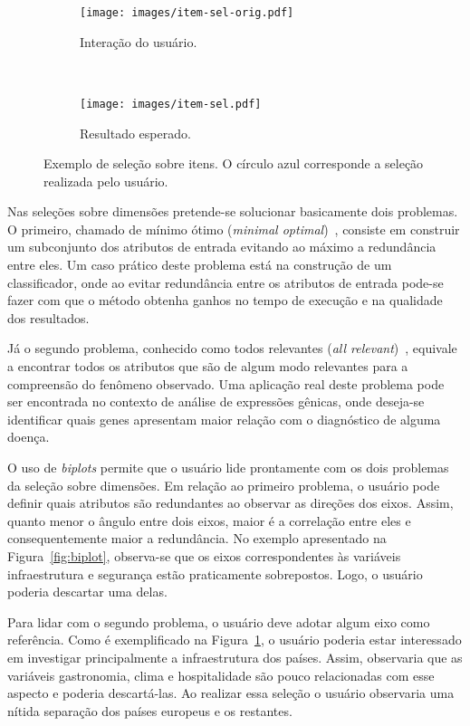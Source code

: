 \begin{figure}[h!]
  \centering
  \begin{subfigure}[b]{0.45\textwidth}
    \centering
    \texttt{[image: images/item-sel-orig.pdf]}
    \caption{Interação do usuário.}
  \end{subfigure}%
  ~
  \begin{subfigure}[b]{0.45\textwidth}
    \centering
    \texttt{[image: images/item-sel.pdf]}
    \caption{Resultado esperado.}
  \end{subfigure} 
  \caption[Exemplo de seleção sobre itens.]
  {Exemplo de seleção sobre itens. O círculo azul
  corresponde a seleção realizada pelo usuário.}
  \label{fig:item-sel}
\end{figure}

Nas seleções sobre dimensões pretende-se solucionar
basicamente dois problemas. O primeiro, chamado de mínimo
ótimo (\emph{minimal optimal})~\cite{Kohavi1997}, consiste
em construir um subconjunto dos atributos de entrada
evitando ao máximo a redundância entre eles. Um caso prático
deste problema está na construção de um classificador, onde
ao evitar redundância entre os atributos de entrada
pode-se fazer com que o método obtenha ganhos no tempo
de execução e na qualidade dos resultados. 

Já o segundo problema, conhecido como todos relevantes
(\emph{all relevant})~\cite{Nilsson2007}, equivale a
encontrar todos os atributos que são de algum modo
relevantes para a compreensão do fenômeno observado. Uma
aplicação real deste problema pode ser encontrada no
contexto de análise de expressões gênicas, onde deseja-se
identificar quais genes apresentam maior relação com o
diagnóstico de alguma doença. 

O uso de \emph{biplots} permite que o usuário lide prontamente com
os dois problemas da seleção sobre dimensões. Em relação ao
primeiro problema, o usuário pode definir quais atributos
são redundantes ao observar as direções dos eixos. Assim,
quanto menor o ângulo entre dois eixos, maior é a correlação
entre eles e consequentemente maior a redundância. No
exemplo apresentado na Figura~\ref{fig:biplot}, observa-se
que os eixos correspondentes às variáveis infraestrutura e
segurança estão praticamente sobrepostos. Logo, o
usuário poderia descartar uma delas. 

Para lidar com o segundo problema, o usuário deve adotar 
algum eixo como referência. Como é exemplificado na
Figura~\ref{fig:item-sel}, o usuário poderia estar
interessado em investigar principalmente a infraestrutura
dos países. Assim, observaria que as variáveis gastronomia,
clima e hospitalidade são pouco relacionadas com esse
aspecto e poderia descartá-las. Ao realizar essa seleção o
usuário observaria uma nítida separação dos países europeus
e os restantes.

